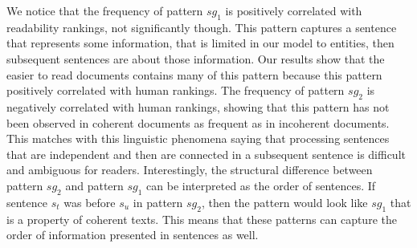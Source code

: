 We notice that the frequency of pattern $sg_1$ is positively correlated with readability rankings, not significantly though. 
This pattern captures a sentence that represents some information, that is limited in our model to entities, then  subsequent sentences are about those information. 
Our results show that the easier to read documents contains many of this pattern because this pattern positively correlated with human rankings. 
The frequency of pattern $sg_2$ is negatively correlated with human rankings, showing that this pattern has not been observed in coherent documents as frequent as in incoherent documents. 
This matches with this linguistic phenomena saying that  processing sentences that are independent and then are connected in a subsequent sentence is difficult and ambiguous for readers. 
Interestingly, the structural difference between pattern $sg_2$ and pattern $sg_1$ can be interpreted as the order of sentences. 
If sentence $s_t$ was before $s_u$ in pattern $sg_2$, then the pattern would look like $sg_1$ that is a property of coherent texts. 
This means that these patterns can capture the order of information presented in sentences as well. 

 



